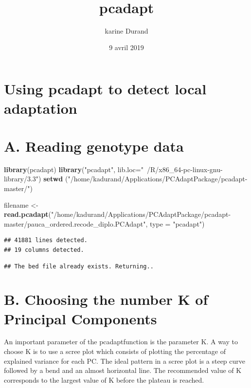 \documentclass[]{article}
\title{pcadapt}
\author{karine Durand}
\date{9 avril 2019}
\newenvironment{Shaded}{\begin{snugshade}}{\end{snugshade}}
\newcommand{\KeywordTok}[1]{\textcolor[rgb]{0.13,0.29,0.53}{\textbf{#1}}}
\newcommand{\DataTypeTok}[1]{\textcolor[rgb]{0.13,0.29,0.53}{#1}}
\newcommand{\StringTok}[1]{\textcolor[rgb]{0.31,0.60,0.02}{#1}}
\newcommand{\NormalTok}[1]{#1}
\begin{document}
\maketitle

\section{Using pcadapt to detect local
adaptation}\label{using-pcadapt-to-detect-local-adaptation}

\section{A. Reading genotype data}\label{a.-reading-genotype-data}

\begin{Shaded}
\begin{Highlighting}[]
\KeywordTok{library}\NormalTok{(pcadapt)}
\KeywordTok{library}\NormalTok{(}\StringTok{"pcadapt"}\NormalTok{, }\DataTypeTok{lib.loc=}\StringTok{"~/R/x86_64-pc-linux-gnu-library/3.3"}\NormalTok{)}
\KeywordTok{setwd}\NormalTok{ (}\StringTok{"/home/kadurand/Applications/PCAdaptPackage/pcadapt-master/"}\NormalTok{)}

\NormalTok{filename <-}\StringTok{ }\KeywordTok{read.pcadapt}\NormalTok{(}\StringTok{"/home/kadurand/Applications/PCAdaptPackage/pcadapt-master/pauca_ordered.recode_diplo.PCAdapt"}\NormalTok{, }\DataTypeTok{type =} \StringTok{"pcadapt"}\NormalTok{)}
\end{Highlighting}
\end{Shaded}

\begin{verbatim}
## 41881 lines detected.
## 19 columns detected.
\end{verbatim}

\begin{verbatim}
## The bed file already exists. Returning..
\end{verbatim}

\section{B. Choosing the number K of Principal
Components}\label{b.-choosing-the-number-k-of-principal-components}

An important parameter of the pcadaptfunction is the parameter K. A way
to choose K is to use a scree plot which consists of plotting the
percentage of explained variance for each PC. The ideal pattern in a
scree plot is a steep curve followed by a bend and an almost horizontal
line. The recommended value of K corresponds to the largest value of K
before the plateau is reached.
\end{document}
